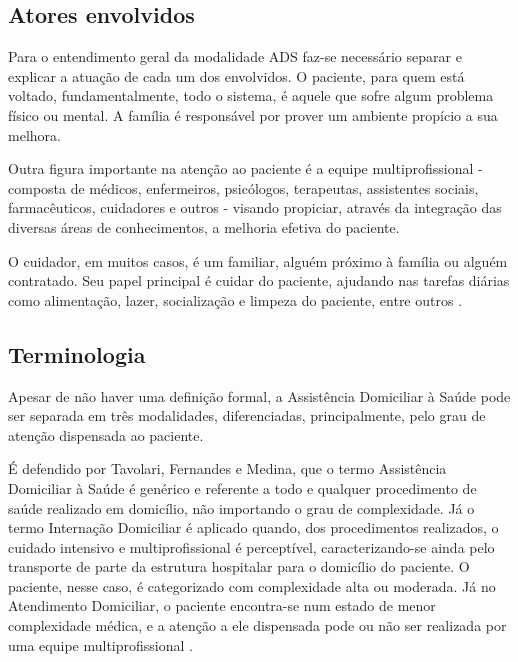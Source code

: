 \subsection{Atores envolvidos}\label{subsec:envolvidos}

Para o entendimento geral da modalidade ADS faz-se necessário separar e
explicar a atuação de cada um dos envolvidos. O paciente, para quem está
voltado, fundamentalmente, todo o sistema, é aquele que sofre algum problema
físico ou mental. A família é responsável por prover um ambiente propício a sua
melhora. 

Outra figura importante na atenção ao paciente é a equipe multiprofissional -
composta de médicos, enfermeiros, psicólogos, terapeutas, assistentes sociais,
farmacêuticos, cuidadores e outros - visando propiciar, através da integração
das diversas áreas de conhecimentos, a melhoria efetiva do paciente.

O cuidador, em muitos casos, é um familiar, alguém próximo à família ou alguém
contratado. Seu papel principal é cuidar do paciente, ajudando nas tarefas
diárias como alimentação, lazer, socialização e limpeza do paciente, entre
outros \cite{amaral2001assistencia}.


\subsection{Terminologia}\label{subsec:terminologia}

Apesar de não haver uma definição formal, a Assistência Domiciliar à Saúde pode
ser separada em três modalidades, diferenciadas, principalmente, pelo grau de 
atenção dispensada ao paciente. 


É defendido por Tavolari, Fernandes e Medina, que o termo Assistência Domiciliar
à Saúde é genérico e referente a todo e qualquer procedimento de saúde realizado
em domicílio, não importando o grau de complexidade. Já o termo Internação
Domiciliar é aplicado quando, dos procedimentos realizados, o cuidado intensivo
e multiprofissional é perceptível, caracterizando-se ainda pelo transporte de
parte da estrutura hospitalar para o domicílio do paciente. O paciente, nesse
caso, é categorizado com complexidade alta ou moderada.
Já no Atendimento Domiciliar, o paciente encontra-se num estado de menor 
complexidade médica, e a atenção a ele dispensada pode ou não ser realizada por
uma equipe multiprofissional \cite{tavolari2000desenvolvimento}.

